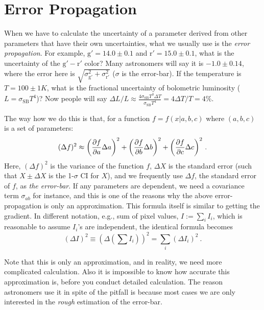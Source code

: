 \section{Error Propagation}
When we have to calculate the uncertainty of a parameter derived from other parameters that have their own uncertainties, what we usually use is the \textit{error propagation}. For example, $ \mathrm{g'} = 14.0 \pm 0.1 $ and $ \mathrm{r'} = 15.0 \pm 0.1 $, what is the uncertainty of the $ \mathrm{g' - r'} $ color? Many astronomers will say it is $ -1.0 \pm 0.14 $, where the error here is $ \sqrt{\sigma_\mathrm{g'}^2 + \sigma_\mathrm{r'}^2} $ ($ \sigma $ is the error-bar). If the temperature is $ T = 100 \pm 1 \si{K} $, what is the fractional uncertainty of bolometric luminosity ($ L = \sigma_\mathrm{SB} T^4 $)? Now people will say $ \Delta L / L \approx \frac{4 \sigma_\mathrm{SB} T^3 \Delta T }{\sigma_\mathrm{SB} T^4} = 4 \Delta T / T = 4 \% $. 

The way how we do this is that, for a function $ f = f(x| a, b, c) $ where $ (a, b, c) $ is a set of parameters:
\begin{equation}\label{eq: error propagation}
  (\Delta f)^2 \approx 
    \qty(\frac{\partial f}{\partial a} \Delta a)^2
    + \qty(\frac{\partial f}{\partial b} \Delta b)^2
    + \qty(\frac{\partial f}{\partial c} \Delta c)^2 ~.
\end{equation}
Here, $ (\Delta f)^2 $ is the variance of the function $ f $, $ \Delta X $ is the standard error (such that $ X \pm \Delta X $ is the 1-$ \sigma $ CI for $ X $), and we frequently use $ \Delta f $, the standard error of $ f $, as \emph{the error-bar}. 
If any parameters are dependent, we need a covariance term $ \sigma_{ab} $ for instance, and this is one of the reasons why the above error-propagation is only an approximation. This formula itself is similar to getting the gradient. In different notation, e.g., sum of pixel values, $ I := \sum_{i} I_i $, which is reasonable to assume $ I_i $'s are independent, the identical formula becomes
\begin{equation}\label{eq: error propagation 2}
  (\Delta I)^2 
    \equiv \left ( \Delta \left ( \sum I_i\right ) \right )^2 
    = \sum_{i} (\Delta I_i)^2 ~.
\end{equation}

Note that this is only an approximation, and in reality, we need more complicated calculation. Also it is impossible to know how accurate this approximation is, before you conduct detailed calculation. The reason astronomers use it in spite of the pitfall is because most cases we are only interested in the \emph{rough} estimation of the error-bar. 




